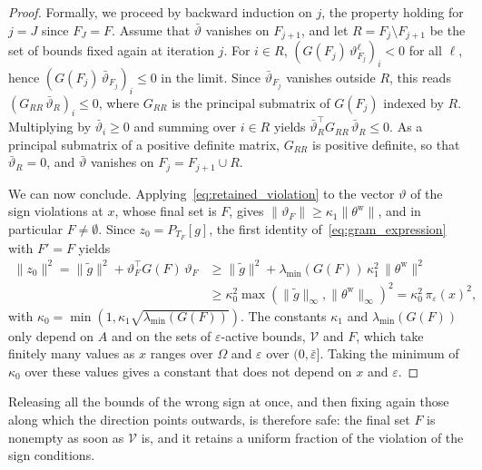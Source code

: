 \documentclass[pdflatex,sn-mathphys-num]{sn-jnl}%
\theoremstyle{thmstyleone}%
\newcommand{\proj}[2]{P_{#1} \left[ {#2} \right]} %
\begin{document}
\begin{proof}
	Formally, we proceed by backward induction on $j$, the property holding for $j = J$ since $F_J = F$. Assume that $\bar\vartheta$ vanishes on $F_{j+1}$, and let $R = F_j\setminus F_{j+1}$ be the set of bounds fixed again at iteration $j$. For $i \in R$, $(G(F_j)\,\vartheta^\ell_{F_j})_i < 0$ for all $\ell$, hence $(G(F_j)\,\bar\vartheta_{F_j})_i \le 0$ in the limit. Since $\bar\vartheta_{F_j}$ vanishes outside $R$, this reads $(G_{RR}\,\bar\vartheta_R)_i \le 0$, where $G_{RR}$ is the principal submatrix of $G(F_j)$ indexed by $R$. Multiplying by $\bar\vartheta_i \ge 0$ and summing over $i \in R$ yields $\bar\vartheta_R^\top G_{RR}\,\bar\vartheta_R \le 0$. As a principal submatrix of a positive definite matrix, $G_{RR}$ is positive definite, so that $\bar\vartheta_R = 0$, and $\bar\vartheta$ vanishes on $F_j = F_{j+1}\cup R$.

	We can now conclude. Applying~\eqref{eq:retained_violation} to the vector $\vartheta$ of the sign violations at $x$, whose final set is $F$, gives $\|\vartheta_F\| \ge \kappa_1\|\theta^{\mathrm{w}}\|$, and in particular $F \ne \emptyset$. Since $z_0 = \proj{T_F}{g}$, the first identity of~\eqref{eq:gram_expression} with $F' = F$ yields
	\begin{align*}
		\|z_0\|^2 = \|\tilde{g}\|^2 + \vartheta_F^\top G(F)\,\vartheta_F &\ge \|\tilde{g}\|^2 + \lambda_{\min}(G(F))\,\kappa_1^2\,\|\theta^{\mathrm{w}}\|^2 \\
		&\ge \kappa_0^2 \max\left(\|\tilde{g}\|_\infty,\|\theta^{\mathrm{w}}\|_\infty\right)^2 = \kappa_0^2\,\pi_\varepsilon(x)^2,
	\end{align*}
	with $\kappa_0 = \min\left(1, \kappa_1\sqrt{\lambda_{\min}(G(F))}\right)$. The constants $\kappa_1$ and $\lambda_{\min}(G(F))$ only depend on $A$ and on the sets of $\varepsilon$-active bounds, $\mathcal{V}$ and $F$, which take finitely many values as $x$ ranges over $\Omega$ and $\varepsilon$ over $(0,\bar\varepsilon]$. Taking the minimum of $\kappa_0$ over these values gives a constant that does not depend on $x$ and $\varepsilon$.
\end{proof}
Releasing all the bounds of the wrong sign at once, and then fixing again those along which the direction points outwards, is therefore safe: the final set $F$ is nonempty as soon as $\mathcal{V}$ is, and it retains a uniform fraction of the violation of the sign conditions.
\end{document}
